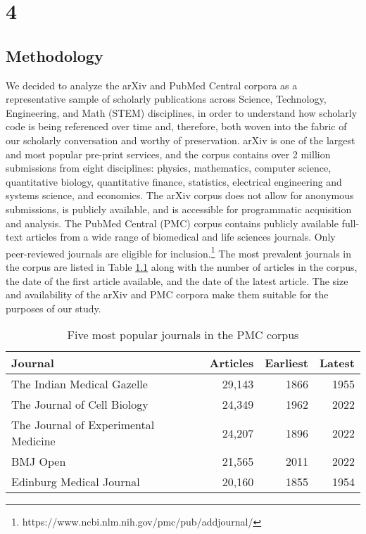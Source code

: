 \chapter{4}
\label{ch:4}

\section{Methodology}
We decided to analyze the arXiv and PubMed Central corpora as a representative sample of scholarly publications across Science, Technology, Engineering, and Math (STEM) disciplines, in order to understand how scholarly code is being referenced over time and, therefore, both woven into the fabric of our scholarly conversation and worthy of preservation. arXiv is one of the largest and most popular pre-print services, and the corpus contains over 2 million submissions \cite{fromme-cornell2022} from eight disciplines: physics, mathematics, computer science, quantitative biology, quantitative finance, statistics, electrical engineering and systems science, and economics. The arXiv corpus does not allow for anonymous submissions, is publicly available, and is accessible for programmatic acquisition and analysis. The PubMed Central (PMC) corpus contains publicly available full-text articles from a wide range of biomedical and life sciences journals. Only peer-reviewed journals are eligible for inclusion.\footnote{https://www.ncbi.nlm.nih.gov/pmc/pub/addjournal/} The most prevalent journals in the corpus are listed in Table \ref{tab:pmc_corpus} along with the number of articles in the corpus, the date of the first article available, and the date of the latest article. The size and availability of the arXiv and PMC corpora make them suitable for the purposes of our study.  

\begin{table}
  \centering
  \begin{tabular}{|l|r|r|r|}
    \hline
    Journal & Articles & Earliest & Latest\\
    \hline
    The Indian Medical Gazelle & 29,143 & 1866 & 1955\\
    The Journal of Cell Biology & 24,349 & 1962 & 2022\\
    The Journal of Experimental Medicine & 24,207 & 1896 & 2022\\
    BMJ Open & 21,565 & 2011 & 2022 \\
    Edinburg Medical Journal & 20,160 & 1855 & 1954\\
  \hline
\end{tabular}
\caption{Five most popular journals in the PMC corpus}
\label{tab:pmc_corpus}
\end{table}

